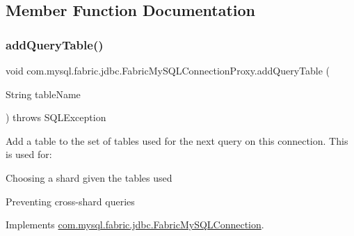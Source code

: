 \subsection{Member Function Documentation}
\mbox{\label{classcom_1_1mysql_1_1fabric_1_1jdbc_1_1_fabric_my_s_q_l_connection_proxy_a5d4617f3849c2bad7d52f5e2991e01ab}} 
\subsubsection{\texorpdfstring{add\+Query\+Table()}{addQueryTable()}}
{\footnotesize\ttfamily void com.\+mysql.\+fabric.\+jdbc.\+Fabric\+My\+S\+Q\+L\+Connection\+Proxy.\+add\+Query\+Table (\begin{DoxyParamCaption}\item[{String}]{table\+Name }\end{DoxyParamCaption}) throws S\+Q\+L\+Exception}

Add a table to the set of tables used for the next query on this connection. This is used for\+: 
\begin{DoxyItemize}
\item Choosing a shard given the tables used 
\item Preventing cross-\/shard queries 
\end{DoxyItemize}

Implements \mbox{\hyperlink{interfacecom_1_1mysql_1_1fabric_1_1jdbc_1_1_fabric_my_s_q_l_connection_a5e830f9ef0fa1d0bae2d5dab997629c3}{com.\+mysql.\+fabric.\+jdbc.\+Fabric\+My\+S\+Q\+L\+Connection}}.

